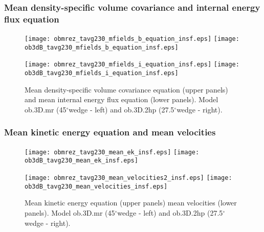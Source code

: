\documentclass[10pt,paper=a4]{report}
\newcommand{\dgr}{\mbox{$^\circ$}}           %
\begin{document}
\newpage

\subsubsection{Mean density-specific volume covariance and internal energy flux equation}

\begin{figure}[!h]
\centerline{
\texttt{[image: obmrez\_tavg230\_mfields\_b\_equation\_insf.eps]}
\texttt{[image: ob3dB\_tavg230\_mfields\_b\_equation\_insf.eps]}}

\centerline{
\texttt{[image: obmrez\_tavg230\_mfields\_i\_equation\_insf.eps]}
\texttt{[image: ob3dB\_tavg230\_mfields\_i\_equation\_insf.eps]}}
\caption{Mean density-specific volume covariance equation (upper panels) and mean internal energy flux equation (lower panels). Model {\sf ob.3D.mr} (45\dgr wedge - left) and {\sf ob.3D.2hp} (27.5\dgr wedge - right). \label{fig:ob-wedge-b-i-eq}}
\end{figure}

\newpage

\subsubsection{Mean kinetic energy equation and mean velocities}

\begin{figure}[!h]
\centerline{
\texttt{[image: obmrez\_tavg230\_mean\_ek\_insf.eps]}
\texttt{[image: ob3dB\_tavg230\_mean\_ek\_insf.eps]}}

\centerline{
\texttt{[image: obmrez\_tavg230\_mean\_velocities2\_insf.eps]}
\texttt{[image: ob3dB\_tavg230\_mean\_velocities\_insf.eps]}}
\caption{Mean kinetic energy equation (upper panels) mean velocities (lower panels). Model {\sf ob.3D.mr} (45\dgr wedge - left) and {\sf ob.3D.2hp} (27.5\dgr wedge - right).  \label{fig:ob-wedge-ek-vel}}
\end{figure}





 
\end{document}
